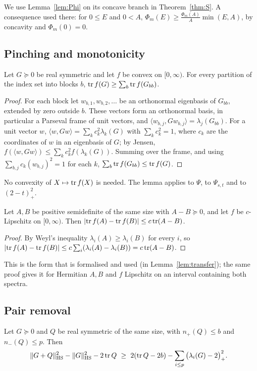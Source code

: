 We use Lemma~\ref{lem:Phi} on its concave branch in Theorem~\ref{thm:S}. A consequence used there: for $0\le E$ and $0<A$,
$\Phi_m(E)\ge\frac{\Phi_m(A)}A\min(E,A)$, by concavity and $\Phi_m(0)=0$.

\subsection{Pinching and monotonicity}
\begin{lemma}[Pinching]\label{lem:pinch}
Let $G\succeq0$ be real symmetric and let $f$ be convex on $[0,\infty)$. For every partition of the index set into blocks $b$,
$\operatorname{tr} f(G)\ge\sum_b\operatorname{tr} f(G_{bb})$.
\end{lemma}

\begin{proof}
For each block let $w_{b,1},w_{b,2},\dots$ be an orthonormal eigenbasis of $G_{bb}$, extended by zero outside $b$. These vectors form an
orthonormal basis, in particular a Parseval frame of unit vectors, and $\langle w_{b,j},Gw_{b,j}\rangle=\lambda_j(G_{bb})$. For a unit vector $w$,
$\langle w,Gw\rangle=\sum_kc_k^2\lambda_k(G)$ with $\sum_kc_k^2=1$, where $c_k$ are the coordinates of $w$ in an eigenbasis of $G$; by Jensen,
$f(\langle w,Gw\rangle)\le\sum_kc_k^2f(\lambda_k(G))$. Summing over the frame, and using $\sum_{b,j}c_{k}(w_{b,j})^2=1$ for each $k$,
$\sum_b\operatorname{tr} f(G_{bb})\le\operatorname{tr} f(G)$.
\end{proof}

No convexity of $X\mapsto\operatorname{tr} f(X)$ is needed. The lemma applies to $\Psi$, to $\Psi_{s,t}$ and to $(2-t)_+^2$.

\begin{lemma}[Monotonicity]\label{lem:weyl}
Let $A,B$ be positive semidefinite of the same size with $A-B\succeq0$, and let $f$ be $c$-Lipschitz on $[0,\infty)$. Then
$\lvert \operatorname{tr} f(A)-\operatorname{tr} f(B)\rvert\le c\operatorname{tr}(A-B)$.
\end{lemma}

\begin{proof}
By Weyl's inequality $\lambda_i(A)\ge\lambda_i(B)$ for every $i$, so
$\lvert \operatorname{tr} f(A)-\operatorname{tr} f(B)\rvert\le c\sum_i(\lambda_i(A)-\lambda_i(B))=c\operatorname{tr}(A-B)$.
\end{proof}

This is the form that is formalised and used (in Lemma~\ref{lem:transfer}); the same proof gives it for Hermitian $A,B$ and $f$ Lipschitz on
an interval containing both spectra.

\subsection{Pair removal}
\begin{lemma}\label{lem:pairrem}
Let $G\succeq0$ and $Q$ be real symmetric of the same size, with $n_+(Q)\le b$ and $n_-(Q)\le p$. Then
\[
\lVert G+Q\rVert_{\mathrm{HS}}^2-\lVert G\rVert_{\mathrm{HS}}^2-2\operatorname{tr} Q\ \ge\ 2(\operatorname{tr} Q-2b)-\sum_{i\le p}\big(\lambda_i(G)-2\big)_+^2 .
\]
\end{lemma}

